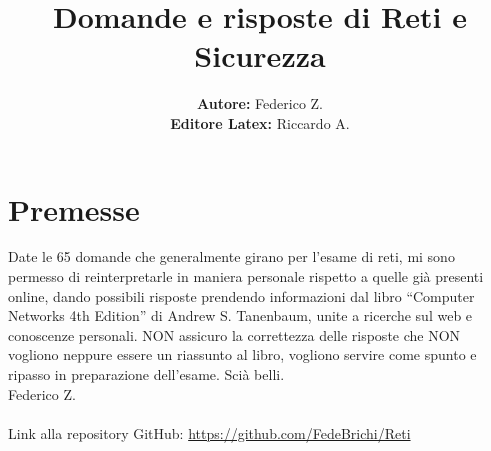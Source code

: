 

\author{\textbf{Autore:} Federico Z. \\ \textbf{Editore Latex:} Riccardo A.}
\title{\textbf{Domande e risposte di Reti e Sicurezza}}



\maketitle
\vspace{5cm}
\section*{Premesse}
Date le 65 domande che generalmente girano per l’esame di reti, mi sono permesso di reinterpretarle in maniera personale rispetto a quelle già presenti online, dando possibili risposte prendendo informazioni dal libro “Computer Networks 4th Edition” di Andrew S. Tanenbaum, unite a ricerche sul web e conoscenze personali. NON assicuro la correttezza delle risposte che NON vogliono neppure essere un riassunto al libro, vogliono servire come spunto e ripasso in preparazione dell’esame. Scià belli. \\
Federico Z. \\
\vspace{1cm} \\
Link alla repository GitHub: \url{https://github.com/FedeBrichi/Reti}

\newpage
\tableofcontents
\newpage



